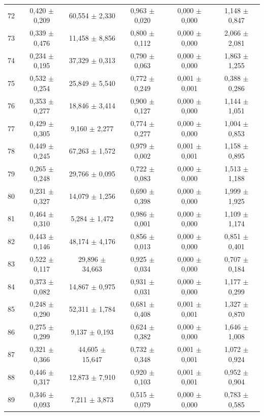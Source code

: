 \begin{tabular}{l c c c c c}
72 & 0,420 $\pm$ 0,209 & 60,554 $\pm$ 2,330 & 0,963 $\pm$ 0,020 & 0,000 $\pm$ 0,000 & 1,148 $\pm$ 0,847 \\
73 & 0,339 $\pm$ 0,476 & 11,458 $\pm$ 8,856 & 0,800 $\pm$ 0,112 & 0,000 $\pm$ 0,000 & 2,066 $\pm$ 2,081 \\
74 & 0,234 $\pm$ 0,195 & 37,329 $\pm$ 0,313 & 0,790 $\pm$ 0,063 & 0,000 $\pm$ 0,000 & 1,863 $\pm$ 1,255 \\
75 & 0,532 $\pm$ 0,254 & 25,849 $\pm$ 5,540 & 0,772 $\pm$ 0,249 & 0,001 $\pm$ 0,001 & 0,388 $\pm$ 0,286 \\
76 & 0,353 $\pm$ 0,277 & 18,846 $\pm$ 3,414 & 0,900 $\pm$ 0,127 & 0,000 $\pm$ 0,000 & 1,144 $\pm$ 1,051 \\
77 & 0,429 $\pm$ 0,305 & 9,160 $\pm$ 2,277 & 0,774 $\pm$ 0,277 & 0,000 $\pm$ 0,000 & 1,004 $\pm$ 0,853 \\
78 & 0,449 $\pm$ 0,245 & 67,263 $\pm$ 1,572 & 0,979 $\pm$ 0,002 & 0,001 $\pm$ 0,001 & 1,158 $\pm$ 0,895 \\
79 & 0,265 $\pm$ 0,248 & 29,766 $\pm$ 0,095 & 0,722 $\pm$ 0,083 & 0,000 $\pm$ 0,000 & 1,513 $\pm$ 1,188 \\
80 & 0,231 $\pm$ 0,327 & 14,079 $\pm$ 1,256 & 0,690 $\pm$ 0,398 & 0,000 $\pm$ 0,000 & 1,999 $\pm$ 1,925 \\
81 & 0,464 $\pm$ 0,310 & 5,284 $\pm$ 1,472 & 0,986 $\pm$ 0,001 & 0,000 $\pm$ 0,000 & 1,109 $\pm$ 1,174 \\
82 & 0,443 $\pm$ 0,146 & 48,174 $\pm$ 4,176 & 0,856 $\pm$ 0,013 & 0,000 $\pm$ 0,000 & 0,851 $\pm$ 0,401 \\
83 & 0,522 $\pm$ 0,117 & 29,896 $\pm$ 34,663 & 0,925 $\pm$ 0,034 & 0,000 $\pm$ 0,000 & 0,707 $\pm$ 0,184 \\
84 & 0,373 $\pm$ 0,082 & 14,867 $\pm$ 0,975 & 0,931 $\pm$ 0,031 & 0,000 $\pm$ 0,000 & 1,177 $\pm$ 0,299 \\
85 & 0,248 $\pm$ 0,290 & 52,311 $\pm$ 1,784 & 0,681 $\pm$ 0,408 & 0,001 $\pm$ 0,001 & 1,327 $\pm$ 0,870 \\
86 & 0,275 $\pm$ 0,299 & 9,137 $\pm$ 0,193 & 0,624 $\pm$ 0,382 & 0,000 $\pm$ 0,000 & 1,646 $\pm$ 1,008 \\
87 & 0,321 $\pm$ 0,366 & 44,605 $\pm$ 15,647 & 0,732 $\pm$ 0,348 & 0,001 $\pm$ 0,001 & 1,072 $\pm$ 0,924 \\
88 & 0,446 $\pm$ 0,317 & 12,873 $\pm$ 7,910 & 0,920 $\pm$ 0,103 & 0,001 $\pm$ 0,001 & 0,952 $\pm$ 0,904 \\
89 & 0,346 $\pm$ 0,093 & 7,211 $\pm$ 3,873 & 0,515 $\pm$ 0,079 & 0,000 $\pm$ 0,000 & 0,783 $\pm$ 0,585 \\

\end{tabular}

